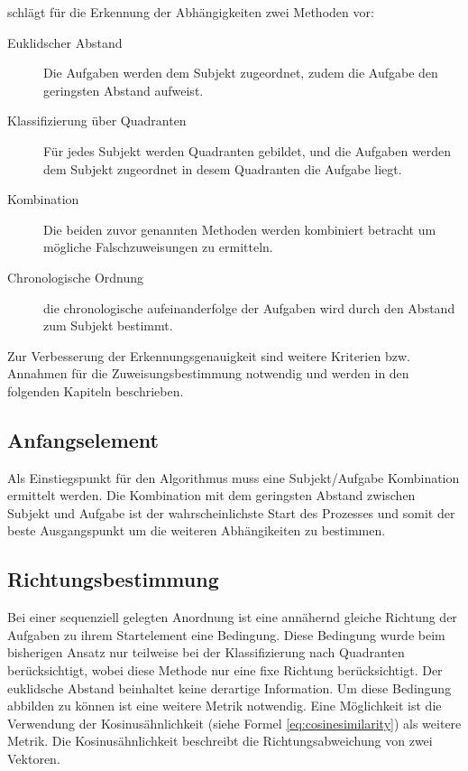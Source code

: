 \citet{max} schlägt für die Erkennung der Abhängigkeiten zwei Methoden vor:
\begin{description}
	\item[Euklidscher Abstand] Die Aufgaben werden dem Subjekt zugeordnet, zudem die Aufgabe den geringsten Abstand aufweist.
	\item[Klassifizierung über Quadranten] Für jedes Subjekt werden Quadranten gebildet, und die Aufgaben werden dem Subjekt zugeordnet in desem Quadranten die Aufgabe liegt.
	\item[Kombination] Die beiden zuvor genannten Methoden werden kombiniert betracht um mögliche Falschzuweisungen zu ermitteln.
	\item[Chronologische Ordnung] die chronologische aufeinanderfolge der Aufgaben wird durch den Abstand zum Subjekt bestimmt.
\end{description}

Zur Verbesserung der Erkennungsgenauigkeit sind weitere Kriterien bzw. Annahmen für die Zuweisungsbestimmung notwendig und werden in den folgenden Kapiteln beschrieben.

\subsection{Anfangselement} %
\label{sub:anfangselement}
Als Einstiegspunkt für den Algorithmus muss eine Subjekt/Aufgabe Kombination ermittelt werden. Die Kombination mit dem geringsten Abstand zwischen Subjekt und Aufgabe ist der wahrscheinlichste Start des Prozesses und somit der beste Ausgangspunkt um die weiteren Abhängikeiten zu bestimmen.
\subsection{Richtungsbestimmung} %
\label{sub:richtungsbestimmung}
Bei einer sequenziell gelegten Anordnung ist eine annähernd gleiche Richtung der Aufgaben zu ihrem Startelement eine Bedingung. Diese Bedingung wurde beim bisherigen Ansatz nur teilweise bei der Klassifizierung nach Quadranten berücksichtigt, wobei diese Methode nur eine fixe Richtung berücksichtigt. Der euklidsche Abstand beinhaltet keine derartige Information. Um diese Bedingung abbilden zu können ist eine weitere Metrik notwendig. Eine Möglichkeit ist die Verwendung der Kosinusähnlichkeit (siehe Formel  \ref{eq:cosinesimilarity}) als weitere Metrik. Die Kosinusähnlichkeit beschreibt die Richtungsabweichung von zwei Vektoren.

